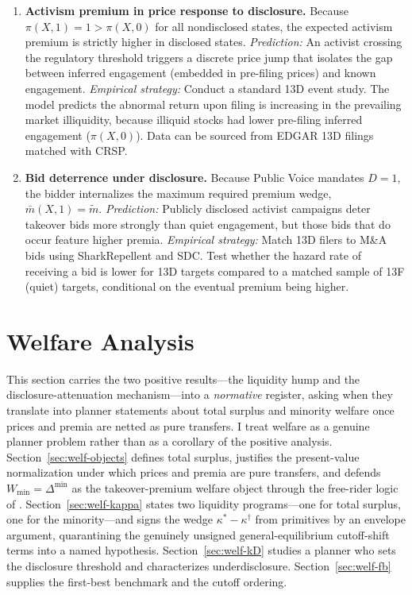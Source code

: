 \documentclass[11pt]{article}
\newcommand{\1}{\mathbf{1}}
\begin{document}
\begin{enumerate}[label=\textbf{\arabic*.}]
    \item \textbf{Activism premium in price response to disclosure.} Because $\pi(X,1) = 1 > \pi(X,0)$ for all nondisclosed states, the expected activism premium is strictly higher in disclosed states.
    \emph{Prediction:} An activist crossing the regulatory threshold triggers a discrete price jump that isolates the gap between inferred engagement (embedded in pre-filing prices) and known engagement.
    \emph{Empirical strategy:} Conduct a standard 13D event study. The model predicts the abnormal return upon filing is increasing in the prevailing market illiquidity, because illiquid stocks had lower pre-filing inferred engagement ($\pi(X,0)$). Data can be sourced from EDGAR 13D filings matched with CRSP.

    \item \textbf{Bid deterrence under disclosure.} Because Public Voice mandates $D=1$, the bidder internalizes the maximum required premium wedge, $\bar{m}(X,1) = \tilde{m}$.
    \emph{Prediction:} Publicly disclosed activist campaigns deter takeover bids more strongly than quiet engagement, but those bids that do occur feature higher premia.
    \emph{Empirical strategy:} Match 13D filers to M\&A bids using SharkRepellent and SDC. Test whether the hazard rate of receiving a bid is lower for 13D targets compared to a matched sample of 13F (quiet) targets, conditional on the eventual premium being higher.
\end{enumerate}

\section{Welfare Analysis}
\label{sec:welfare}

This section carries the two positive results---the liquidity hump and the disclosure-attenuation mechanism---into a \emph{normative} register, asking when they translate into planner statements about total surplus and minority welfare once prices and premia are netted as pure transfers. I treat welfare as a genuine planner problem rather than as a corollary of the
positive analysis. Section~\ref{sec:welf-objects} defines total surplus,
justifies the present-value normalization under which prices and premia are pure
transfers, and defends $W_{\min}=\Delta^{\min}$ as the takeover-premium welfare
object through the free-rider logic of \citet{GrossmanHart1980}.
Section~\ref{sec:welf-kappa} states two liquidity programs---one for total
surplus, one for the minority---and signs the wedge
$\kappa^{\ast}-\kappa^{\dagger}$ from primitives by an envelope argument,
quarantining the genuinely unsigned general-equilibrium cutoff-shift terms into a
named hypothesis. Section~\ref{sec:welf-kD} studies a planner who sets the
disclosure threshold and characterizes underdisclosure. Section~\ref{sec:welf-fb}
supplies the first-best benchmark and the cutoff ordering.
\end{document}
